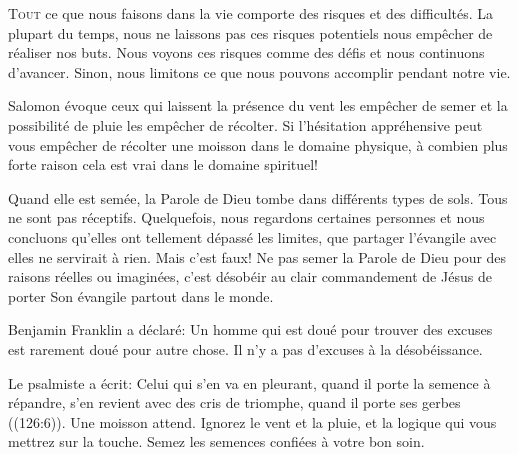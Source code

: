 \lettrine{T}{out} ce que nous faisons dans la vie
 comporte des risques et des difficultés.
 La plupart du temps, nous ne laissons pas ces risques potentiels
 nous empêcher de réaliser nos buts.
 Nous voyons ces risques comme des défis et nous continuons d'avancer.
 Sinon, nous limitons ce que nous pouvons accomplir pendant notre vie. 

Salomon évoque ceux qui laissent la présence du vent les empêcher
 de semer et la possibilité de pluie les empêcher de récolter.
 Si l'hésitation appréhensive peut vous empêcher de récolter
 une moisson dans le domaine physique, à combien plus forte raison
 cela est vrai dans le domaine spirituel! 

Quand elle est semée, la Parole de Dieu tombe dans différents types de sols.
 Tous ne sont pas réceptifs.
 Quelquefois, nous regardons certaines personnes et nous concluons
 qu'elles ont tellement dépassé les limites, que partager l'évangile 
 avec elles ne servirait à rien. Mais c'est faux!
 Ne pas semer la Parole de Dieu pour des raisons réelles ou imaginées,
 c'est désobéir au clair commandement de Jésus de porter Son évangile 
 partout dans le monde. 

Benjamin Franklin a déclaré: 
 \Og Un homme qui est doué pour trouver des excuses est rarement doué
 pour autre chose. \Fg{} Il n'y a pas d'excuses à la désobéissance. 


Le psalmiste a écrit: 
 \Og Celui qui s'en va en pleurant, quand il porte la semence à répandre,
 s'en revient avec des cris de triomphe, quand il porte ses gerbes \Fg{} 
 ((126:6)). Une moisson attend. Ignorez le vent et la pluie,
 et la logique qui vous mettrez sur la touche.
 Semez les semences confiées à votre bon soin.

\dvrule






